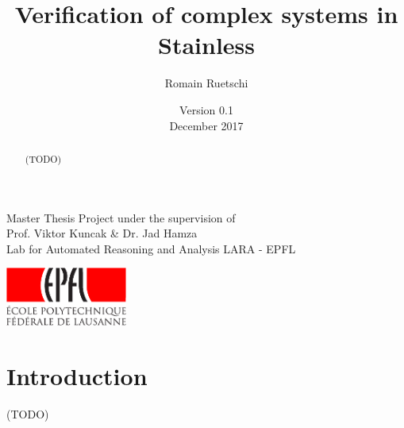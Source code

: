\documentclass[a4paper,twoside]{article}
\title{Verification of complex systems in Stainless}
\date{
  {\small Version 0.1}\\
  December 2017
}
\author{Romain Ruetschi}
\makeatletter
\newcommand*{\flipmargins}{%
  \clearpage
  \setlength{\@tempdima}{\oddsidemargin}%
  \setlength{\oddsidemargin}{\evensidemargin}%
  \setlength{\evensidemargin}{\@tempdima}%
  \if@reversemargin
    \normalmarginpar
  \else
    \reversemarginpar
  \fi
}
\newcommand{\TODO}[1]{\textcolor{YellowOrange}{(TODO)}} %
\makeatother
\begin{document}
\maketitle

\vfill

\begin{abstract}

\TODO{Abstract}

\end{abstract}

\vfill

\begin{center}
    Master Thesis Project under the supervision of \\
    Prof. Viktor Kuncak \& Dr. Jad Hamza \\
    Lab for Automated Reasoning and Analysis LARA - EPFL
\end{center}

\begin{center}
    \includegraphics[width = 40mm]{res/epfl-logo}
\end{center}

\clearpage\null\newpage

\restoregeometry              %
\flipmargins
\pagestyle{mystyle_no_header}

\tableofcontents

\clearpage
\pagestyle{mystyle}


\section{Introduction}

\TODO{Introduction}

%
%
%
%
%
\end{document}
